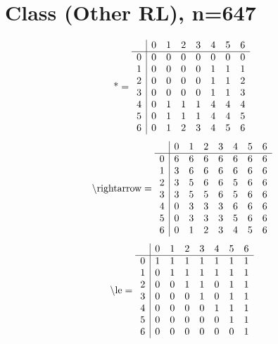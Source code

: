 \documentclass[11pt]{article}
\begin{document}
\section{Class (Other RL), n=647}
\[\text{*} = 
\begin{array}{r | r r r r r r r}
 & 0 & 1 & 2 & 3 & 4 & 5 & 6 \\ \hline
0 & 0 & 0 & 0 & 0 & 0 & 0 & 0 \\
1 & 0 & 0 & 0 & 0 & 1 & 1 & 1 \\
2 & 0 & 0 & 0 & 0 & 1 & 1 & 2 \\
3 & 0 & 0 & 0 & 0 & 1 & 1 & 3 \\
4 & 0 & 1 & 1 & 1 & 4 & 4 & 4 \\
5 & 0 & 1 & 1 & 1 & 4 & 4 & 5 \\
6 & 0 & 1 & 2 & 3 & 4 & 5 & 6 \\
\end{array}
\]
\[\text{\textbackslash rightarrow} = 
\begin{array}{r | r r r r r r r}
 & 0 & 1 & 2 & 3 & 4 & 5 & 6 \\ \hline
0 & 6 & 6 & 6 & 6 & 6 & 6 & 6 \\
1 & 3 & 6 & 6 & 6 & 6 & 6 & 6 \\
2 & 3 & 5 & 6 & 6 & 5 & 6 & 6 \\
3 & 3 & 5 & 5 & 6 & 5 & 6 & 6 \\
4 & 0 & 3 & 3 & 3 & 6 & 6 & 6 \\
5 & 0 & 3 & 3 & 3 & 5 & 6 & 6 \\
6 & 0 & 1 & 2 & 3 & 4 & 5 & 6 \\
\end{array}
\]
\[\text{\textbackslash le} = 
\begin{array}{r | r r r r r r r}
 & 0 & 1 & 2 & 3 & 4 & 5 & 6 \\ \hline
0 & 1 & 1 & 1 & 1 & 1 & 1 & 1 \\
1 & 0 & 1 & 1 & 1 & 1 & 1 & 1 \\
2 & 0 & 0 & 1 & 1 & 0 & 1 & 1 \\
3 & 0 & 0 & 0 & 1 & 0 & 1 & 1 \\
4 & 0 & 0 & 0 & 0 & 1 & 1 & 1 \\
5 & 0 & 0 & 0 & 0 & 0 & 1 & 1 \\
6 & 0 & 0 & 0 & 0 & 0 & 0 & 1 \\
\end{array}
\]
\end{document}
